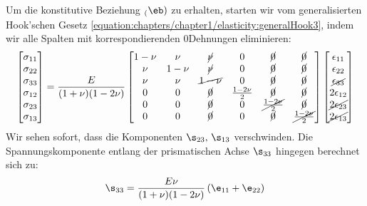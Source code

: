 \documentclass[letterpaper,10pt,german]{jupyterBook}
\begin{document}
\sphinxAtStartPar
Um die konstitutive Beziehung \(\sb(\eb)\) zu erhalten, starten wir vom generalisierten Hook’schen Gesetz \eqref{equation:chapters/chapter1/elasticity:generalHook3}, indem wir alle Spalten mit korrespondierenden 0\sphinxhyphen{}Dehnungen eliminieren:
\begin{equation}\label{equation:chapters/chapter1/elasticity:evz1}
\begin{split}\begin{bmatrix} 
\sigma_{11} \\
\sigma_{22} \\
\sigma_{33} \\
\sigma_{12} \\
\sigma_{23} \\
\sigma_{13} 
\end{bmatrix} = \frac{E}{(1+\nu)(1-2\nu)}\begin{bmatrix}
1-\nu & \nu & \cancel{\nu} & 0 & \cancel{0} & \cancel{0} \\
\nu & 1-\nu & \cancel{\nu} & 0 & \cancel{0} & \cancel{0} \\
\nu & \nu & \cancel{1-\nu} & 0 & \cancel{0} & \cancel{0} \\
0 & 0 & \cancel{0} & \frac{1-2\nu}{2} & \cancel{0} & \cancel{0} \\
0 & 0 & \cancel{0} & 0 & \cancel{\frac{1-2\nu}{2}} & \cancel{0} \\
0 & 0 & \cancel{0} & 0 & \cancel{0} & \cancel{\frac{1-2\nu}{2}} \\ 
\end{bmatrix} \begin{bmatrix} \epsilon_{11} \\ \epsilon_{22} \\ \cancel{\epsilon_{33}} \\ 2\epsilon_{12} \\ \cancel{2\epsilon_{23}} \\ \cancel{2\epsilon_{13}} \end{bmatrix}\end{split}
\end{equation}
\sphinxAtStartPar
Wir sehen sofort, dass die Komponenten \(\s_{23},\, \s_{13}\) verschwinden. Die Spannungskomponente entlang der prismatischen Achse \(\s_{33}\) hingegen berechnet sich zu:
\begin{equation*}
\begin{split}\s_{33} = \frac{E \nu}{(1+\nu)(1-2\nu)} \left(\e_{11} + \e_{22} \right)\end{split}
\end{equation*}
\end{document}
